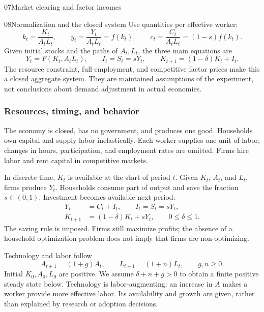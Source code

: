 \begin{modelsetup}[1]
\begin{modelcondition}{07}{Market clearing and factor incomes}
\end{modelcondition}
\begin{modelcondition}{08}{Normalization and the closed system}
Use quantities per effective worker:
\[
k_t=\frac{K_t}{A_tL_t},\qquad y_t=\frac{Y_t}{A_tL_t}=f(k_t),
\qquad c_t=\frac{C_t}{A_tL_t}=(1-s)f(k_t).
\]
Given initial stocks and the paths of $A_t,L_t$, the three main equations are
\[
Y_t=F(K_t,A_tL_t),\qquad I_t=S_t=sY_t,\qquad
K_{t+1}=(1-\delta)K_t+I_t.
\]
The resource constraint, full employment, and competitive factor prices make
this a closed aggregate system. They are maintained assumptions of the
experiment, not conclusions about demand adjustment in actual economies.
\end{modelcondition}
\end{modelsetup}


\subsubsection{Resources, timing, and behavior}

The economy is closed, has no government, and produces one good. Households own
capital and supply labor inelastically. Each worker supplies one unit of labor;
changes in hours, participation, and employment rates are omitted. Firms hire
labor and rent capital in competitive markets.

In discrete time, $K_t$ is available at the start of period $t$. Given $K_t$,
$A_t$, and $L_t$, firms produce $Y_t$. Households consume part of output and
save the fraction $s\in(0,1)$. Investment becomes available next period:
\begin{align}
Y_t&=C_t+I_t,\qquad I_t=S_t=sY_t,\label{eq:solow-resources}\\
K_{t+1}&=(1-\delta)K_t+sY_t,\qquad 0\leq\delta\leq1.\label{eq:solow-capital}
\end{align}
The saving rule is imposed. Firms still maximize profits; the absence of a
household optimization problem does not imply that firms are non-optimizing.

Technology and labor follow
\begin{equation}\label{eq:solow-exogenous}
A_{t+1}=(1+g)A_t,\qquad L_{t+1}=(1+n)L_t,
\qquad g,n\geq0.
\end{equation}
Initial $K_0,A_0,L_0$ are positive. We assume $\delta+n+g>0$ to obtain a finite
positive steady state below. Technology is labor-augmenting: an increase in
$A$ makes a worker provide more effective labor. Its availability and growth
are given, rather than explained by research or adoption decisions.

